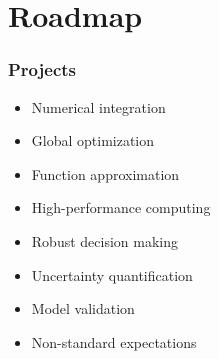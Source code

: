 \section{Roadmap}
\begin{frame}\frametitle{Projects}

	\begin{multicols}{2}
	\vspace{0.3cm}
	\begin{itemize}\setlength\itemsep{1em}
    \item Numerical integration
    \item Global optimization
    \item Function approximation
    \item High-performance computing
	\end{itemize}

	\pause

  \vspace{0.3cm}
	\begin{itemize}\setlength\itemsep{1em}
    \item Robust decision making
    \item Uncertainty quantification
    \item Model validation
    \item Non-standard expectations
	\end{itemize}
	\end{multicols}

\end{frame}
